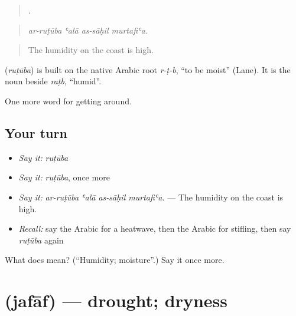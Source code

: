 \begin{quote}
   .
\end{quote}

\begin{quote}
\emph{ar-ruṭūba ʿalā as-sāḥil murtafiʿa.}
\end{quote}

\begin{quote}
The humidity on the coast is high.
\end{quote}

\begin{cousinweb}
\textbf{} (\emph{ruṭūba}) is built on the native Arabic root \emph{r-ṭ-b}, \textquotedblleft{}to be moist\textquotedblright{} (Lane). It is the noun beside \emph{raṭb}, \textquotedblleft{}humid\textquotedblright{}.
\end{cousinweb}

\begin{grammarlens}[title={What you've built}]
One more word for getting around.
\end{grammarlens}

\subsection*{Your turn}
\begin{itemize}
\raggedright
  \item \emph{Say it:} \emph{ruṭūba}
  \item \emph{Say it:} \emph{ruṭūba}, once more
  \item \emph{Say it:} \emph{ar-ruṭūba ʿalā as-sāḥil murtafiʿa.} — The humidity on the coast is high.
  \item \emph{Recall:} say the Arabic for a heatwave, then the Arabic for stifling, then say \emph{ruṭūba} again
\end{itemize}

\begin{tcolorbox}[breakable,colback=teal!4,colframe=teal!35!black,title={Before you move on}]
What does  mean? (\textquotedblleft{}Humidity; moisture\textquotedblright{}.) Say it once more.
\end{tcolorbox}
\section[\texorpdfstring{\ar{جفاف} (jafāf)}{جفاف (jafāf)}]{ (jafāf) — drought; dryness}

\label{lesson:AR-C484-jafaf}



